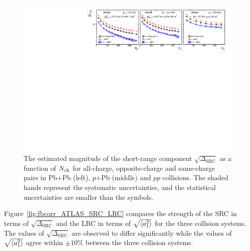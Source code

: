 \begin{figure}[H]
\centering
\includegraphics[width=.95\linewidth]{figs/chapter_fbcorr/ATLAS_SRC_charge.pdf}
\caption{The estimated magnitude of the short-range component $\sqrt{\Delta_\text{SRC}}$ as a function of $N_\text{ch}$ for all-charge, opposite-charge and same-charge pairs in Pb+Pb (left), $p$+Pb (middle) and $pp$ collisions. The shaded hands represent the systematic uncertainties, and the statistical uncertainties are smaller than the symbols.}
\label{fig:fbcorr_ATLAS_SRC_charge}
\end{figure}

Figure~\ref{fig:fbcorr_ATLAS_SRC_LRC} compares the strength of the SRC in terms of $\sqrt{\Delta_\text{SRC}}$ and the LRC in terms of $\sqrt{\left\langle a_1^2\right\rangle}$ for the three collision systems. The values of $\sqrt{\Delta_\text{SRC}}$ are observed to differ significantly while the values of $\sqrt{\left\langle a_1^2\right\rangle}$ agree within $\pm 10\%$ between the three collision systems.

